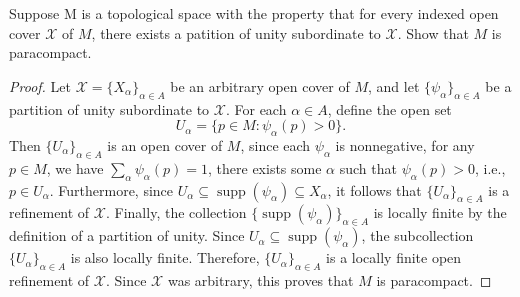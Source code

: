\begin{problem}
    Suppose M is a topological space with the property that for every indexed open cover $\mathcal{X}$ of $M$, there exists a patition of unity subordinate to $\mathcal{X}$. Show that $M$ is paracompact.
    \begin{proof}
        Let \( \mathcal{X} = \{X_\alpha\}_{\alpha \in A} \) be an arbitrary open cover of \( M \), and let \( \{\psi_\alpha\}_{\alpha \in A} \) be a partition of unity subordinate to \( \mathcal{X} \). For each \( \alpha \in A \), define the open set
        \[
        U_\alpha = \{ p \in M \colon \psi_\alpha(p) > 0 \}.
        \]
        Then \( \{U_\alpha\}_{\alpha \in A} \) is an open cover of \( M \), since each $\psi_\alpha$ is nonnegative, for any \( p \in M \), we have \( \sum_\alpha \psi_\alpha(p) = 1 \), there exists some \( \alpha \) such that \( \psi_\alpha(p) > 0 \), i.e., \( p \in U_\alpha \).
        Furthermore, since \( U_\alpha \subseteq \operatorname{supp}(\psi_\alpha) \subseteq X_\alpha \), it follows that \( \{U_\alpha\}_{\alpha \in A} \) is a refinement of \( \mathcal{X} \).
        Finally, the collection \( \{\operatorname{supp}(\psi_\alpha)\}_{\alpha \in A} \) is locally finite by the definition of a partition of unity. Since \( U_\alpha \subseteq \operatorname{supp}(\psi_\alpha) \), the subcollection \( \{U_\alpha\}_{\alpha \in A} \) is also locally finite.
        Therefore, \( \{U_\alpha\}_{\alpha \in A} \) is a locally finite open refinement of \( \mathcal{X} \). Since \( \mathcal{X} \) was arbitrary, this proves that \( M \) is paracompact.
    \end{proof}
\end{problem}

